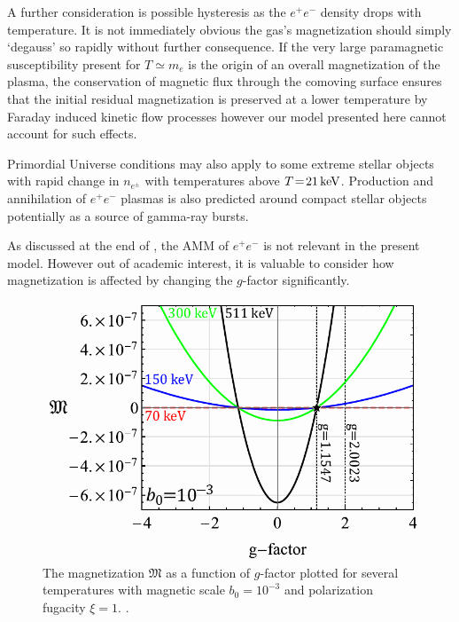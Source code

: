 A further consideration is possible hysteresis as the $e^{+}e^{-}$ density drops with temperature. It is not immediately obvious the gas's magnetization should simply `degauss' so rapidly without further consequence. If the very large paramagnetic susceptibility present for $T\simeq m_{e}$ is the origin of an overall magnetization of the plasma, the conservation of magnetic flux through the comoving surface ensures that the initial residual magnetization is preserved at a lower temperature by Faraday induced kinetic flow processes however our model presented here cannot account for such effects.

Primordial Universe conditions may also apply to some extreme stellar objects with rapid change in $n_{e^{\pm}}$ with temperatures above $T\!=\!21\text{\,keV}$. Production and annihilation of $e^{+}e^{-}$ plasmas is also predicted around compact stellar objects~\cite{Ruffini:2009hg,Ruffini:2012it} potentially as a source of gamma-ray bursts.

\noindent As discussed at the end of , the AMM of $e^{+}e^{-}$ is not relevant in the present model. However out of academic interest, it is valuable to consider how magnetization is affected by changing the $g$-factor significantly.

\begin{figure}[ht]
 \centering
 \includegraphics[width=0.90\linewidth]{plots/thesis_gfac.pdf}
 \caption{The magnetization $\mathfrak M$ as a function of $g$-factor plotted for several temperatures with magnetic scale $b_{0}=10^{-3}$ and polarization fugacity $\xi=1$. . }
 \label{fig:gfac} 
\end{figure}

